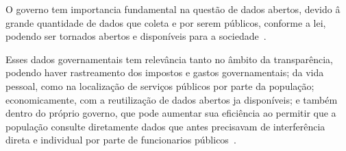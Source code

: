 O governo tem importancia fundamental na questão de dados abertos, devido â grande quantidade de dados que coleta e por serem públicos, conforme a lei, podendo ser tornados abertos e disponíveis para a sociedade~\cite{openknowledge}.

Esses dados governamentais tem relevância tanto no âmbito da transparência, podendo haver rastreamento dos impostos e gastos governamentais; da vida pessoal, como na localização de serviços públicos por parte da população; economicamente, com a reutilização de dados abertos ja disponíveis; e também dentro do próprio governo, que pode aumentar sua eficiência ao permitir que a população consulte diretamente dados que antes precisavam de interferência direta e individual por parte de funcionarios públicos~\cite{openknowledge}.









